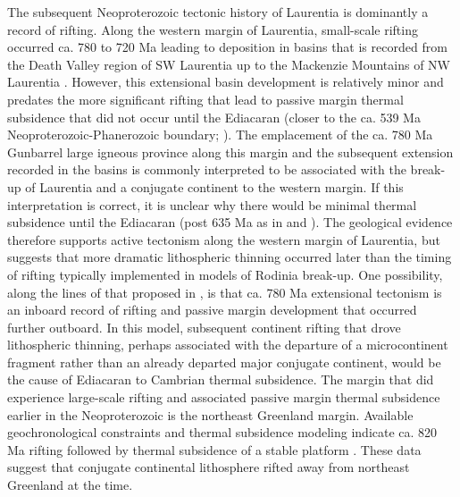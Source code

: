 \documentclass[11pt,letterpaper]{article}
\begin{document}
The subsequent Neoproterozoic tectonic history of Laurentia is dominantly a record of rifting. Along the western margin of Laurentia, small-scale rifting occurred ca. 780 to 720 Ma leading to deposition in basins that is recorded from the Death Valley region of SW Laurentia up to the Mackenzie Mountains of NW Laurentia \citep{Rooney2017a}. However, this extensional basin development is relatively minor and predates the more significant rifting that lead to passive margin thermal subsidence that did not occur until the Ediacaran (closer to the ca. 539 Ma Neoproterozoic-Phanerozoic boundary; \citealp{Bond1984a, Levy1991a}). The emplacement of the ca. 780 Ma Gunbarrel large igneous province along this margin and the subsequent extension recorded in the basins is commonly interpreted to be associated with the break-up of Laurentia and a conjugate continent to the western margin. If this interpretation is correct, it is unclear why there would be minimal thermal subsidence until the Ediacaran (post 635 Ma as in \citealp{Levy1991a} and \citealp{Witkosky2018a}). The geological evidence therefore supports active tectonism along the western margin of Laurentia, but suggests that more dramatic lithospheric thinning occurred later than the timing of rifting typically implemented in models of Rodinia break-up. One possibility, along the lines of that proposed in \citet{Ross1991a}, is that ca. 780 Ma extensional tectonism is an inboard record of rifting and passive margin development that occurred further outboard. In this model, subsequent continent rifting that drove lithospheric thinning, perhaps associated with the departure of a microcontinent fragment rather than an already departed major conjugate continent, would be the cause of Ediacaran to Cambrian thermal subsidence. The margin that did experience large-scale rifting and associated passive margin thermal subsidence earlier in the Neoproterozoic is the northeast Greenland margin. Available geochronological constraints and thermal subsidence modeling indicate ca. 820 Ma rifting followed by thermal subsidence of a stable platform \citep{Maloof2006a, Halverson2018a}. These data suggest that conjugate continental lithosphere rifted away from northeast Greenland at the time. 
\end{document}
